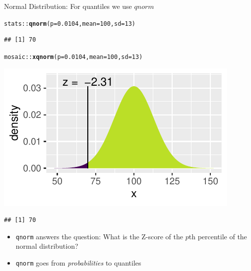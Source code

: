 \documentclass[10pt]{beamer}\usepackage[]{graphicx}\usepackage[]{color}
\makeatletter
\newcommand{\hlnum}[1]{\textcolor[rgb]{0.686,0.059,0.569}{#1}}%
\newcommand{\hlopt}[1]{\textcolor[rgb]{0,0,0}{#1}}%
\newcommand{\hlstd}[1]{\textcolor[rgb]{0.345,0.345,0.345}{#1}}%
\newcommand{\hlkwc}[1]{\textcolor[rgb]{0.333,0.667,0.333}{#1}}%
\newcommand{\hlkwd}[1]{\textcolor[rgb]{0.737,0.353,0.396}{\textbf{#1}}}%
\newenvironment{kframe}{%
 \def\at@end@of@kframe{}%
 \ifinner\ifhmode%
  \def\at@end@of@kframe{\end{minipage}}%
  \begin{minipage}{\columnwidth}%
 \fi\fi%
 \def\FrameCommand##1{\hskip\@totalleftmargin \hskip-\fboxsep
 \colorbox{shadecolor}{##1}\hskip-\fboxsep
     \hskip-\linewidth \hskip-\@totalleftmargin \hskip\columnwidth}%
 \MakeFramed {\advance\hsize-\width
   \@totalleftmargin\z@ \linewidth\hsize
   \@setminipage}}%
 {\par\unskip\endMakeFramed%
 \at@end@of@kframe}
\newenvironment{knitrout}{}{} %
\makeatother
\begin{document}
\begin{frame}[fragile]{Normal Distribution: For quantiles we use $qnorm$}
	
	
	
\begin{knitrout}\tiny
{}\color{fgcolor}\begin{kframe}
\begin{alltt}
\hlstd{stats}\hlopt{::}\hlkwd{qnorm}\hlstd{(}\hlkwc{p} \hlstd{=} \hlnum{0.0104}\hlstd{,} \hlkwc{mean} \hlstd{=} \hlnum{100}\hlstd{,} \hlkwc{sd} \hlstd{=} \hlnum{13}\hlstd{)}
\end{alltt}
\begin{verbatim}
## [1] 70
\end{verbatim}
\end{kframe}
\end{knitrout}
	
	
	
\begin{knitrout}\tiny
{}\color{fgcolor}\begin{kframe}
\begin{alltt}
\hlstd{mosaic}\hlopt{::}\hlkwd{xqnorm}\hlstd{(}\hlkwc{p} \hlstd{=} \hlnum{0.0104}\hlstd{,} \hlkwc{mean} \hlstd{=} \hlnum{100}\hlstd{,} \hlkwc{sd} \hlstd{=} \hlnum{13}\hlstd{)}
\end{alltt}
\end{kframe}

{\centering \includegraphics[width=0.6\linewidth]{figure/probs5-1} 

}


\begin{kframe}\begin{verbatim}
## [1] 70
\end{verbatim}
\end{kframe}
\end{knitrout}
	
	
	
	\small{
		\begin{itemize}
			\item \texttt{qnorm} answers the question: What is the Z-score of the $p$th percentile of the normal distribution?
			
			\item \texttt{qnorm} goes from \textit{probabilities} to quantiles 
		\end{itemize}
	}
\end{frame}
\end{document}
